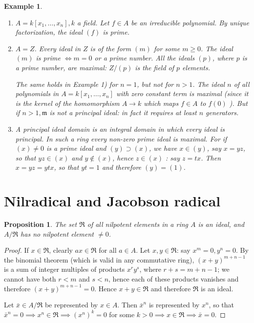 \documentclass[class=book, crop=false]{standalone}
\newtheorem{proposition}[theorem]{Proposition}
\newtheorem*{example}{Example}
\theoremstyle{definition}
\theoremstyle{remark}
\begin{document}
\begin{example}
  \begin{enumerate}[1)]
    \item $A=k\left[x_{1}, \ldots, x_{n}\right], k$ a field. Let $f \in A$ be an
          irreducible polynomial. By unique factorization, the ideal $(f)$ is
          prime.
    \item $A=Z$. Every ideal in $Z$ is of the form $(m)$ for some $m \geq 0$.
          The ideal $(m)$ is prime $\iff m=0$ or a prime number. All
          the ideals $(p)$, where $p$ is a prime number, are maximal: $Z /(p)$
          is the field of $p$ elements.

          The same holds in Example 1) for $n=1$, but not for $n>1$. The ideal
          $n$ of all polynomials in $A=k\left[x_{1}, \ldots, x_{n}\right]$ with
          zero constant term is maximal (since it is the kernel of the
          homomorphism $A \to k$ which maps $f \in A$ to $f(0)$ ). But if
          $n>1, \mathfrak{m}$ is not a principal ideal: in fact it requires at
          least $n$ generators.
    \item A \textit{principal ideal domain} is an integral domain in which every
          ideal is principal. In such a ring every non-zero prime ideal is
          maximal. For if $(x) \neq 0$ is a prime ideal and $(y) \supset(x)$, we
          have $x \in(y)$, say $x=y z$, so that $y z \in(x)$ and $y \notin(x)$,
          hence $z \in(x)$ : say $z=t x$. Then $x=y z=y t x$, so that $y t=1$
          and therefore $(y)=(1)$.
  \end{enumerate}
\end{example}

\section{Nilradical and Jacobson radical}
\begin{proposition}
  The set $\Re$ of all nilpotent elements in a ring $A$ is an ideal, and
  $A / \Re$ has no nilpotent element $\neq 0$.
\end{proposition}
\begin{proof}
  If $x \in \Re$, clearly $a x \in \Re$ for all $a \in A$. Let $x, y \in \Re$:
  say $x^{m}=0, y^{n}=0$. By the binomial theorem (which is valid in any
  commutative ring), $(x+y)^{m+n-1}$ is a sum of integer multiples of products
  $x^{r} y^{s}$, where $r+s=m+n-1$; we cannot have both $r<m$ and $s<n$, hence
  each of these products vanishes and therefore $(x+y)^{m+n-1}=0$. Hence
  $x+y \in \Re$ and therefore $\Re$ is an ideal.

  Let $\bar{x} \in A / \Re$ be represented by $x \in A$. Then $\bar{x}^{n}$ is
  represented by $x^{n}$, so that
  $\bar{x}^{n}=0 \implies x^{n} \in \Re \implies\left(x^{n}\right)^{k}=0$ for
  some $k>0 \implies x \in \Re \implies \bar{x}=0$.
\end{proof}
\end{document}
